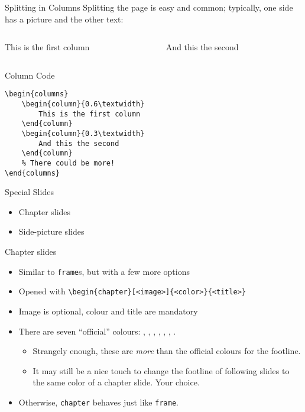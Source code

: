 \begin{frame}[fragile]{Splitting in Columns}
Splitting the page is easy and common;
typically, one side has a picture and the other text:
\begin{columns}
\begin{column}{0.6\textwidth}
This is the first column
\end{column}
\begin{column}{0.3\textwidth}
And this the second
\end{column}
\end{columns}
\begin{block}{Column Code}
\begin{verbatim}
\begin{columns}
    \begin{column}{0.6\textwidth}
        This is the first column
    \end{column}
    \begin{column}{0.3\textwidth}
        And this the second
    \end{column}
    % There could be more!
\end{columns}
\end{verbatim}
\end{block}
\end{frame}

\begin{chapter}{}{Special Slides}
\begin{itemize}
\item Chapter slides
\item Side-picture slides
\end{itemize}
\end{chapter}

\begin{frame}[fragile]{Chapter slides}
\begin{itemize}
\item Similar to \verb|frame|s, but with a few more options
\item Opened with \verb|\begin{chapter}[<image>]{<color>}{<title>}|
\item Image is optional, colour and title are mandatory
\item There are seven ``official'' colours: , 
, , 
, , , 
.
      \begin{itemize}
      \item Strangely enough, these are \emph{more} than the official colours 
      for the footline.
      \item It may still be a nice touch to change the footline of following 
      slides to the same color of a chapter slide. Your choice.
      \end{itemize}
\item Otherwise, \verb|chapter| behaves just like \verb|frame|.
\end{itemize}
\end{frame}

